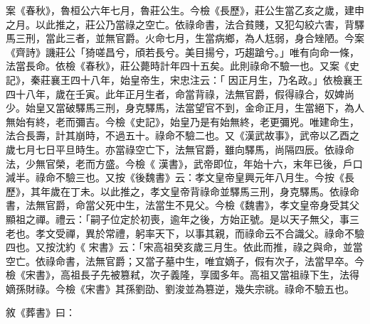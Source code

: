 \begin{pinyinscope}
 案《春秋》，魯桓公六年七月，魯莊公生。今檢《長歷》，莊公生當乙亥之歲，建申之月。以此推之，莊公乃當祿之空亡。依祿命書，法合貧賤，又犯勾絞六害，背驛馬三刑，當此三者，並無官爵。火命七月，生當病鄉，為人尪弱，身合矬陋。今案《齊詩》譏莊公「猗嗟昌兮，頎若長兮。美目揚兮，巧趨蹌兮。」唯有向命一條，法當長命。依檢《春秋》，莊公薨時計年四十五矣。此則祿命不驗一也。又案《史記》，秦莊襄王四十八年，始皇帝生，宋忠注云：「
 因正月生，乃名政。」依檢襄王四十八年，歲在壬寅。此年正月生者，命當背祿，法無官爵，假得祿合，奴婢尚少。始皇又當破驛馬三刑，身克驛馬，法當望官不到，金命正月，生當絕下，為人無始有終，老而彌吉。今檢《史記》，始皇乃是有始無終，老更彌兇。唯建命生，法合長壽，計其崩時，不過五十。祿命不驗二也。又《漢武故事》，武帝以乙酉之歲七月七日平旦時生。亦當祿空亡下，法無官爵，雖向驛馬，尚隔四辰。依祿命法，少無官榮，老而方盛。今檢《
 漢書》，武帝即位，年始十六，末年已後，戶口減半。祿命不驗三也。又按《後魏書》云：孝文皇帝皇興元年八月生。今按《長歷》，其年歲在丁未。以此推之，孝文皇帝背祿命並驛馬三刑，身克驛馬。依祿命書，法無官爵，命當父死中生，法當生不見父。今檢《魏書》，孝文皇帝身受其父顯祖之禪。禮云：「嗣子位定於初喪，逾年之後，方始正號。是以天子無父，事三老也。孝文受禪，異於常禮，躬率天下，以事其親，而祿命云不合識父。祿命不驗四也。又按沈約《
 宋書》云：「宋高祖癸亥歲三月生。依此而推，祿之與命，並當空亡。依祿命書，法無官爵；又當子墓中生，唯宜嫡子，假有次子，法當早卒。今檢《宋書》，高祖長子先被篡弒，次子義隆，享國多年。高祖又當祖祿下生，法得嫡孫財祿。今檢《宋書》其孫劉劭、劉浚並為篡逆，幾失宗祧。祿命不驗五也。



 敘《葬書》曰：




\end{pinyinscope}
